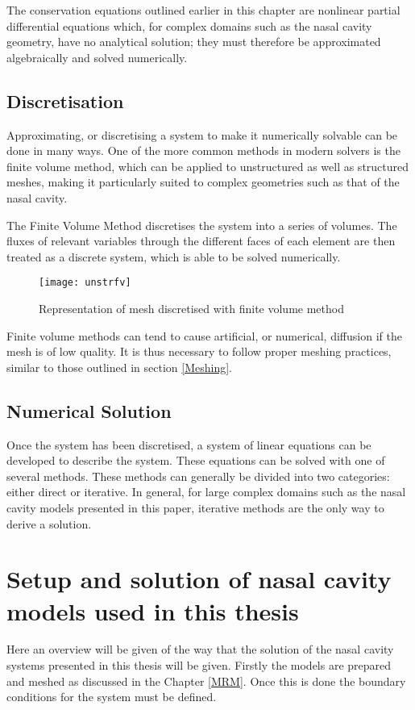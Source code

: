 The conservation equations outlined earlier in this chapter are nonlinear partial differential equations which, for complex domains such as the nasal cavity geometry, have no analytical solution; they must therefore be approximated algebraically and solved numerically.

\subsection{Discretisation}

Approximating, or discretising a system to make it numerically solvable can be done in many ways. One of the more common methods in modern solvers is the finite volume method, which can be applied to unstructured as well as structured meshes, making it particularly suited to complex geometries such as that of the nasal cavity.

The Finite Volume Method discretises the system into a series of volumes. The fluxes of relevant variables through the different faces of each element are then treated as a discrete system, which is able to be solved numerically.

\begin{figure}
  \texttt{[image: unstrfv]}
  \caption{Representation of mesh discretised with finite volume method}
  \label{usfv}
\end{figure}

Finite volume methods can tend to cause artificial, or numerical, diffusion if the mesh is of low quality. It is thus necessary to follow proper meshing practices, similar to those outlined in section \ref{Meshing}.

\subsection{Numerical Solution}

Once the system has been discretised, a system of linear equations can be developed to describe the system. These equations can be solved with one of several methods. These methods can generally be divided into two categories: either direct or iterative. In general, for large complex domains such as the nasal cavity models presented in this paper, iterative methods are the only way to derive a solution.

\section{Setup and solution of nasal cavity models used in this thesis}
Here an overview will be given of the way that the solution of the nasal cavity systems presented in this thesis will be given. Firstly the models are prepared and meshed as discussed in the Chapter \ref{MRM}. Once this is done the boundary conditions for the system must be defined. 

